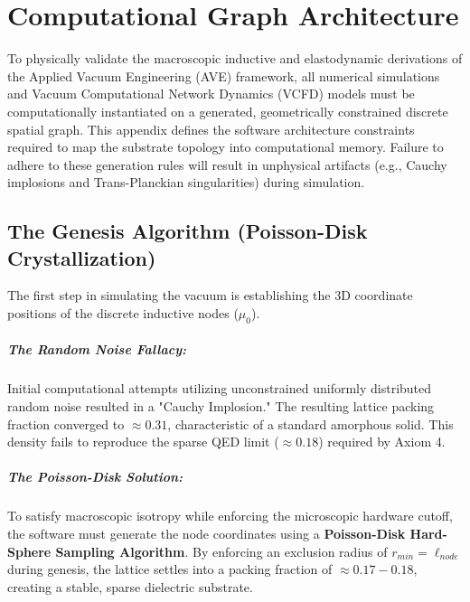 \chapter{Computational Graph Architecture}
\label{app:computational_graph}

To physically validate the macroscopic inductive and elastodynamic derivations of the Applied Vacuum Engineering (AVE) framework, all numerical simulations and Vacuum Computational Network Dynamics (VCFD) models must be computationally instantiated on a generated, geometrically constrained discrete spatial graph. This appendix defines the software architecture constraints required to map the substrate topology into computational memory. Failure to adhere to these generation rules will result in unphysical artifacts (e.g., Cauchy implosions and Trans-Planckian singularities) during simulation.

\section{The Genesis Algorithm (Poisson-Disk Crystallization)}
The first step in simulating the vacuum is establishing the 3D coordinate positions of the discrete inductive nodes ($\mu_0$).

\paragraph{The Random Noise Fallacy:} Initial computational attempts utilizing unconstrained uniformly distributed random noise resulted in a "Cauchy Implosion." The resulting lattice packing fraction converged to $\approx 0.31$, characteristic of a standard amorphous solid. This density fails to reproduce the sparse QED limit ($\approx 0.18$) required by Axiom 4.

\paragraph{The Poisson-Disk Solution:} To satisfy macroscopic isotropy while enforcing the microscopic hardware cutoff, the software must generate the node coordinates using a \textbf{Poisson-Disk Hard-Sphere Sampling Algorithm}. By enforcing an exclusion radius of $r_{min} = \ell_{node}$ during genesis, the lattice settles into a packing fraction of $\approx 0.17-0.18$, creating a stable, sparse dielectric substrate.


